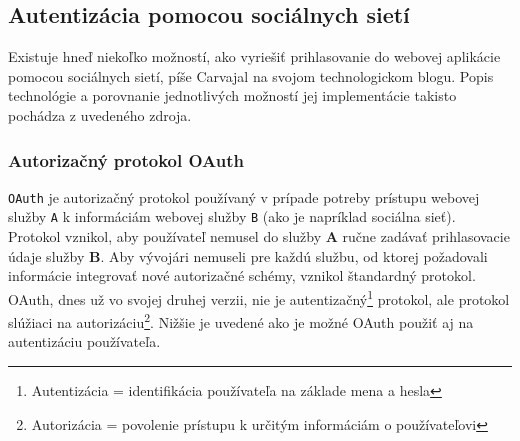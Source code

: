 \documentclass[12pt,oneside]{fithesis2}
\begin{document}
		\subsection{Autentizácia pomocou sociálnych sietí} \label{soc-auth}
      		\par Existuje hneď niekoľko možností, ako vyriešiť prihlasovanie do webovej aplikácie pomocou sociálnych sietí, píše Carvajal\cite{carvajal14} na svojom technologickom blogu. Popis technológie a porovnanie jednotlivých možností jej implementácie takisto pochádza z uvedeného zdroja.
      		
			\subsubsection{Autorizačný protokol OAuth}
      		\par \texttt{OAuth} je autorizačný protokol používaný v prípade potreby prístupu webovej služby \texttt{A} k informáciám webovej služby \texttt{B} (ako je napríklad sociálna sieť). Protokol vznikol, aby používateľ nemusel do služby \textbf{A} ručne zadávať prihlasovacie údaje  služby \textbf{B}. Aby vývojári nemuseli pre každú službu, od ktorej požadovali informácie integrovať nové autorizačné schémy, vznikol štandardný protokol. OAuth, dnes už vo svojej druhej verzii, nie je autentizačný\footnote{Autentizácia = identifikácia používateľa na základe mena a hesla} protokol, ale protokol slúžiaci na autorizáciu\footnote{Autorizácia = povolenie prístupu k určitým informáciám o používateľovi}. Nižšie je uvedené ako je možné OAuth použiť aj na autentizáciu používateľa.
      		
\end{document}
